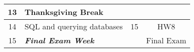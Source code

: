 \documentclass{article}\usepackage[]{graphicx}\usepackage[]{color}
\begin{document}
\begin{center}
\begin{tabular}{ |c|p{5cm}|c|c| }
                                                                                    \hline 
                        13 & Thanksgiving Break &  &  \\ 
                                                                                                            \hline 
                        14 & SQL and querying databases & 15 & HW8 \\ 
                                                                                                            \hline 
                        15 & {\bf \em Final Exam Week} & & Final Exam\\ 
                        \hline
                        \end{tabular}

\end{center}
\end{document}
